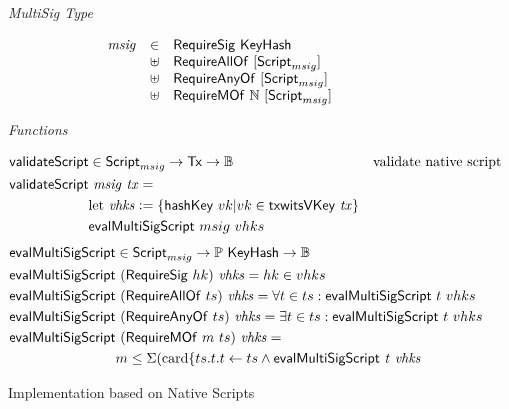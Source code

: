 \documentclass[11pt,a4paper,dvipsnames]{article}
\newcommand{\N}{\ensuremath{\mathbb{N}}}
\newcommand{\Bool}{\ensuremath{\mathbb{B}}}
\newcommand{\Tx}{\type{Tx}}
\newcommand{\Script}{\type{Script}}
\newcommand{\ScriptMSig}{\Script_{msig}}
\newcommand{\KeyHash}{\type{KeyHash}}
\theoremstyle{definition}
\newcommand{\leteq}{\ensuremath{\mathrel{\mathop:}=}}
\begin{document}
\begin{figure*}[hbt]
  \emph{MultiSig Type}

  \begin{equation*}
    \begin{array}{rll}
      \var{msig} & \in & \type{RequireSig}~\KeyHash\\
      & \uniondistinct &
         \type{RequireAllOf}~[\ScriptMSig] \\
      & \uniondistinct&
         \type{RequireAnyOf}~[\ScriptMSig] \\
      & \uniondistinct&
        \type{RequireMOf}~\N~[\ScriptMSig]
    \end{array}
  \end{equation*}

  \emph{Functions}

  \begin{align*}
    \fun{validateScript} & \in\ScriptMSig\to\Tx\to\Bool & \text{validate native
                                                          script} \\
    \fun{validateScript} & ~\var{msig}~\var{tx}= \\
                         & \textrm{let}~\var{vhks}\leteq \{\fun{hashKey}~vk \vert
                           vk \in \fun{txwitsVKey}~\var{tx}\} \\
                         & \fun{evalMultiSigScript}~msig~vhks\\
  \end{align*}
  \begin{align*}
    \fun{evalMultiSigScript} & \in\ScriptMSig\to\powerset\KeyHash\to\Bool & \\
    \fun{evalMultiSigScript} & ~(\type{RequireSig}~hk)~\var{vhks} =  hk \in vhks \\
    \fun{evalMultiSigScript} & ~(\type{RequireAllOf}~ts)~\var{vhks} =
                              \forall t \in ts: \fun{evalMultiSigScript}~t~vhks\\
    \fun{evalMultiSigScript} & ~(\type{RequireAnyOf}~ts)~\var{vhks} =
                              \exists t \in ts: \fun{evalMultiSigScript}~t~vhks\\
    \fun{evalMultiSigScript} & ~(\type{RequireMOf}~m~ts)~\var{vhks} = \\
                             & m \leq \Sigma
                               (\textrm{card} \{ t s.t. t \leftarrow ts \wedge \fun{evalMultiSigScript}~\var{t}~\var{vhks}
  \end{align*}

  \caption{Implementation based on Native Scripts}
  \label{fig:types-msig}
\end{figure*}
\end{document}
